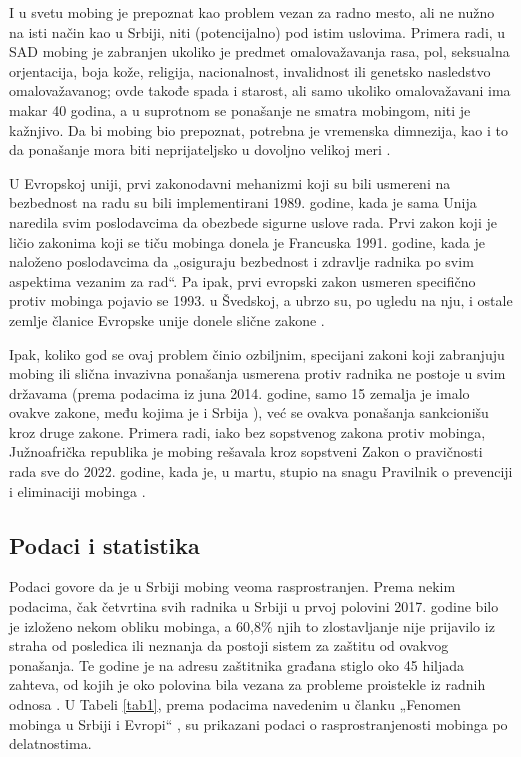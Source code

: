 \documentclass[a4paper]{article}
\newcommand{\quotes}[1]{„#1“}
\begin{document}
    I u svetu mobing je prepoznat kao problem vezan za radno mesto, ali ne nužno na isti način kao u Srbiji, niti (potencijalno) pod istim uslovima. Primera radi, u SAD mobing je zabranjen ukoliko je predmet omalovažavanja rasa, pol, seksualna orjentacija, boja kože, religija, nacionalnost, invalidnost ili genetsko nasledstvo omalovažavanog; ovde takođe spada i starost, ali samo ukoliko omalovažavani ima makar 40 godina, a u suprotnom se ponašanje ne smatra mobingom, niti je kažnjivo. Da bi mobing bio prepoznat, potrebna je vremenska dimnezija, kao i to da ponašanje mora biti neprijateljsko u dovoljno velikoj meri \cite{usharassment}.
    
    U Evropskoj uniji, prvi zakonodavni mehanizmi koji su bili usmereni na bezbednost na radu su bili implementirani 1989. godine, kada je sama Unija naredila svim poslodavcima da obezbede sigurne uslove rada. Prvi zakon koji je ličio zakonima koji se tiču mobinga donela je Francuska 1991. godine, kada je naloženo poslodavcima da \quotes{osiguraju bezbednost i zdravlje radnika po svim aspektima vezanim za rad}. Pa ipak, prvi evropski zakon usmeren specifično protiv mobinga pojavio se 1993. u Švedskoj, a ubrzo su, po ugledu na nju, i ostale zemlje članice Evropske unije donele slične zakone \cite{francemobbing}.
    
    Ipak, koliko god se ovaj problem činio ozbiljnim, specijani zakoni koji zabranjuju mobing ili slična invazivna ponašanja usmerena protiv radnika ne postoje u svim državama (prema podacima iz juna 2014. godine, samo 15 zemalja je imalo ovakve zakone, među kojima je i Srbija \cite{samo15}), već se ovakva ponašanja sankcionišu kroz druge zakone. Primera radi, iako bez sopstvenog zakona protiv mobinga, Južnoafrička republika je mobing rešavala kroz sopstveni Zakon o pravičnosti rada sve do 2022. godine, kada je, u martu, stupio na snagu Pravilnik o prevenciji i eliminaciji mobinga \cite{jar1, jar2}.
    
    \subsection{Podaci i statistika}
    
    Podaci govore da je u Srbiji mobing veoma rasprostranjen. Prema nekim podacima, čak četvrtina svih radnika u Srbiji u prvoj polovini 2017. godine bilo je izloženo nekom obliku mobinga, a 60,8\% njih to zlostavljanje nije prijavilo iz straha od posledica ili neznanja da postoji sistem za zaštitu od ovakvog ponašanja. Te godine je na adresu zaštitnika građana stiglo oko 45 hiljada zahteva, od kojih je oko polovina bila vezana za probleme proistekle iz radnih odnosa \cite{kamaticacetvrtina, fenomensrbijaevropa}. U Tabeli \ref{tab1}, prema podacima navedenim u članku \quotes{Fenomen mobinga u Srbiji i Evropi} \cite{fenomensrbijaevropa}, su prikazani podaci o rasprostranjenosti mobinga po delatnostima.
    
\end{document}
